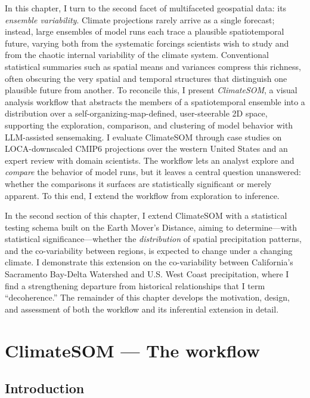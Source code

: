 In this chapter, I turn to the second facet of multifaceted geospatial data: its \emph{ensemble variability}.
%
Climate projections rarely arrive as a single forecast; instead, large ensembles of model runs each trace a plausible spatiotemporal future, varying both from the systematic forcings scientists wish to study and from the chaotic internal variability of the climate system.
%
Conventional statistical summaries such as spatial means and variances compress this richness, often obscuring the very spatial and temporal structures that distinguish one plausible future from another.
%
To reconcile this, I present \emph{ClimateSOM}, a visual analysis workflow that abstracts the members of a spatiotemporal ensemble into a distribution over a self-organizing-map-defined, user-steerable 2D space, supporting the exploration, comparison, and clustering of model behavior with LLM-assisted sensemaking.
%
I evaluate ClimateSOM through case studies on LOCA-downscaled CMIP6 projections over the western United States and an expert review with domain scientists.
%
The workflow lets an analyst explore and \emph{compare} the behavior of model runs, but it leaves a central question unanswered: whether the comparisons it surfaces are statistically significant or merely apparent.
%
To this end, I extend the workflow from exploration to inference.

In the second section of this chapter, I extend ClimateSOM with a statistical testing schema built on the Earth Mover's Distance, aiming to determine---with statistical significance---whether the \emph{distribution} of spatial precipitation patterns, and the co-variability between regions, is expected to change under a changing climate.
%
I demonstrate this extension on the co-variability between California's Sacramento Bay-Delta Watershed and U.S. West Coast precipitation, where I find a strengthening departure from historical relationships that I term ``decoherence.''
%
The remainder of this chapter develops the motivation, design, and assessment of both the workflow and its inferential extension in detail.

\section{ClimateSOM --- The workflow}\label{sec:climatesom-workflow}
\subsection{Introduction}\label{sec:intro}

